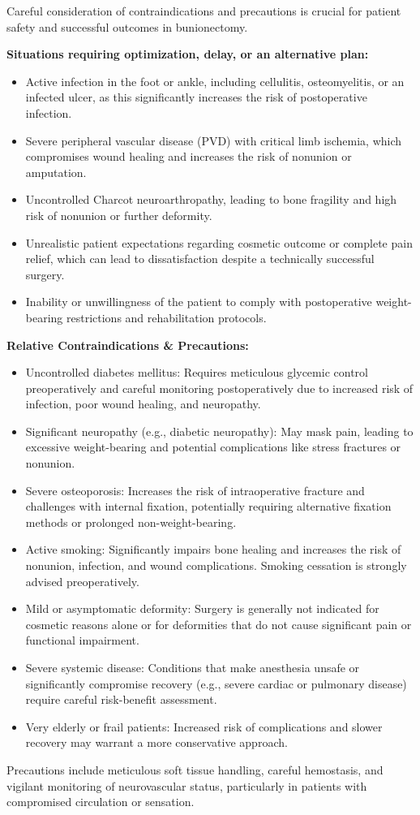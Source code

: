 Careful consideration of contraindications and precautions is crucial for patient safety and successful outcomes in bunionectomy.

\textbf{Situations requiring optimization, delay, or an alternative plan:}
\begin{itemize}
  \item Active infection in the foot or ankle, including cellulitis, osteomyelitis, or an infected ulcer, as this significantly increases the risk of postoperative infection.
  \item Severe peripheral vascular disease (PVD) with critical limb ischemia, which compromises wound healing and increases the risk of nonunion or amputation.
  \item Uncontrolled Charcot neuroarthropathy, leading to bone fragility and high risk of nonunion or further deformity.
  \item Unrealistic patient expectations regarding cosmetic outcome or complete pain relief, which can lead to dissatisfaction despite a technically successful surgery.
  \item Inability or unwillingness of the patient to comply with postoperative weight-bearing restrictions and rehabilitation protocols.
\end{itemize}

\textbf{Relative Contraindications \& Precautions:}
\begin{itemize}
  \item Uncontrolled diabetes mellitus: Requires meticulous glycemic control preoperatively and careful monitoring postoperatively due to increased risk of infection, poor wound healing, and neuropathy.
  \item Significant neuropathy (e.g., diabetic neuropathy): May mask pain, leading to excessive weight-bearing and potential complications like stress fractures or nonunion.
  \item Severe osteoporosis: Increases the risk of intraoperative fracture and challenges with internal fixation, potentially requiring alternative fixation methods or prolonged non-weight-bearing.
  \item Active smoking: Significantly impairs bone healing and increases the risk of nonunion, infection, and wound complications. Smoking cessation is strongly advised preoperatively.
  \item Mild or asymptomatic deformity: Surgery is generally not indicated for cosmetic reasons alone or for deformities that do not cause significant pain or functional impairment.
  \item Severe systemic disease: Conditions that make anesthesia unsafe or significantly compromise recovery (e.g., severe cardiac or pulmonary disease) require careful risk-benefit assessment.
  \item Very elderly or frail patients: Increased risk of complications and slower recovery may warrant a more conservative approach.
\end{itemize}
Precautions include meticulous soft tissue handling, careful hemostasis, and vigilant monitoring of neurovascular status, particularly in patients with compromised circulation or sensation.

